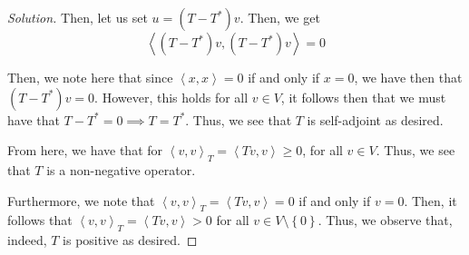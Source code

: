 \documentclass{article}
\newenvironment{solution}{\begin{proof}[Solution]}{\end{proof}}
\newcommand{\innerproduct}[2]{\left\langle{#1}, {#2}\right\rangle}
\begin{document}
\begin{solution}
	Then, let us set $u = (T-T^{*})v$. Then, we get
	\begin{equation*}
		\innerproduct{(T-T^{*})v}{(T-T^{*})v} = 0
	\end{equation*}

	Then, we note here that since $\innerproduct{x}{x} = 0$ if and only if $x = 0$, we have then that $(T-T^{*})v = 0$. However, this holds for all $v \in V$, it follows then that we must have that $T-T^{*} = 0 \implies T = T^{*}$. Thus, we see that $T$ is self-adjoint as desired.
	
	From here, we have that for $\innerproduct{v}{v}_{T} = \innerproduct{Tv}{v} \geq 0$, for all $v \in V$. Thus, we see that $T$ is a non-negative operator.
	
	Furthermore, we note that $\innerproduct{v}{v}_{T} = \innerproduct{Tv}{v} = 0$ if and only if $v = 0$. Then, it follows that $\innerproduct{v}{v}_{T} = \innerproduct{Tv}{v} > 0$ for all $v \in V \setminus \left\{  0 \right\}$. Thus, we observe that, indeed, $T$ is positive as desired.
\end{solution}

\newpage
\end{document}
